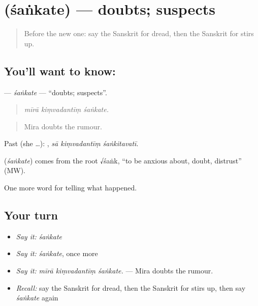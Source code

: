 \section[\texorpdfstring{\sk{शंकते} (śaṅkate)}{शंकते (śaṅkate)}]{ (śaṅkate) — doubts; suspects}

\label{lesson:SA-C311-sankate}



\begin{quote}
Before the new one: say the Sanskrit for dread, then the Sanskrit for stirs up.
\end{quote}

\subsection*{You'll want to know: }
\textbf{} — \emph{śaṅkate} — \textquotedblleft{}doubts; suspects\textquotedblright{}.

\begin{quote}
  
\end{quote}

\begin{quote}
\emph{mīrā kiṃvadantīṃ śaṅkate.}
\end{quote}

\begin{quote}
Mira doubts the rumour.
\end{quote}

Past (she …):   , \emph{sā kiṃvadantīṃ śaṅkitavatī}.

\begin{cousinweb}
\textbf{} (\emph{śaṅkate}) comes from the root √śaṅk, \textquotedblleft{}to be anxious about, doubt, distrust\textquotedblright{} (MW).
\end{cousinweb}

\begin{grammarlens}[title={What you've built}]
One more word for telling what happened.
\end{grammarlens}

\subsection*{Your turn}
\begin{itemize}
\raggedright
  \item \emph{Say it:} \emph{śaṅkate}
  \item \emph{Say it:} \emph{śaṅkate}, once more
  \item \emph{Say it:} \emph{mīrā kiṃvadantīṃ śaṅkate.} — Mira doubts the rumour.
  \item \emph{Recall:} say the Sanskrit for dread, then the Sanskrit for stirs up, then say \emph{śaṅkate} again
\end{itemize}

